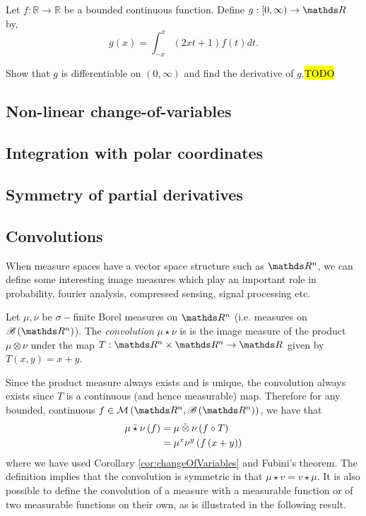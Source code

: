 \begin{example}
\label{exa:isi2007samplepsb4}Let $f:\mathbb{R}\rightarrow\mathbb{R}$
be a bounded continuous function. Define $g:[0,\infty)\rightarrow\R$
by, 
\[
g(x)=\int_{-x}^{x}(2xt+1)f(t)dt.
\]

Show that $g$ is differentiable on $(0,\infty)$ and find the derivative
of $g$.\hl{TODO}
\end{example}


\subsection{Non-linear change-of-variables}

\subsection{Integration with polar coordinates}

\subsection{Symmetry of partial derivatives}

\subsection{Convolutions\label{subsec:convolutions}}

When measure spaces have a vector space structure such as $\R^{n}$,
we can define some interesting image measures which play an important
role in probability, fourier analysis, compressed sensing, signal
processing etc.
\begin{defn}
\label{def:convolution}Let $\mu,\nu$ be $\sigma-$finite Borel measures
on $\R^{n}$ (i.e. measures on $\borel\left(\R^{n}\right)$). The
\emph{convolution} $\mu\star\nu$ is is the image measure of the product
$\mu\otimes\nu$ under the map $T:\R^{n}\times\R^{n}\to\R$ given
by $T\left(x,y\right)=x+y$.

Since the product measure always exists and is unique, the convolution
always exists since $T$ is a continuous (and hence measurable) map.
Therefore for any bounded, continuous $f\in\mathcal{M}\left(\R^{n},\borel\left(\R^{n}\right)\right)$,
we have that
\begin{align*}
\bar{\mu\star\nu}\left(f\right) & =\bar{\mu\otimes\nu}\left(f\circ T\right)\\
 & =\mu^{x}\nu^{y}\left(f\left(x+y\right)\right)
\end{align*}
where we have used Corollary \ref{cor:changeOfVariables} and Fubini's
theorem. The definition implies that the convolution is symmetric
in that $\mu\star v=v\star\mu$. It is also possible to define the
convolution of a measure with a measurable function or of two measurable
functions on their own, as is illustrated in the following result.
\end{defn}

